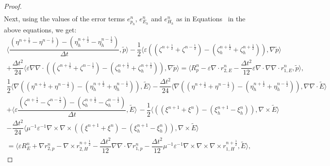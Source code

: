 \documentclass{amsart}
\theoremstyle{thmstyleone}%
\theoremstyle{thmstyletwo}%
\theoremstyle{thmstylethree}%
\newcommand{\aInnerproduct}[2]{\bigl\langle #1, #2 \bigr\rangle}
\begin{document}
\begin{proof}
\begin{multline*}
 \end{multline*}
 Next, using the values of the error terms $e_{p_h}^n$, $e_{E_h}^n$ and $e_{H_h}^n$ as in Equations~ in the above equations, we get:
 \begin{multline*}
  \aInnerproduct{\dfrac{\left(\eta^{n + \frac{1}{2}} - \eta^{n - \frac{1}{2}}\right) - \left( \eta^{n + \frac{1}{2}}_h - \eta^{n - \frac{1}{2}}_h \right)}{\Delta t}}{\widetilde{p}}  - \dfrac{1}{2} \aInnerproduct{ \varepsilon \left( \left( \zeta^{n + \frac{1}{2}} + \zeta^{n - \frac{1}{2}} \right) - \left(\zeta_h^{n + \frac{1}{2}} + \zeta^{n + \frac{1}{2}}_h \right) \right)}{\nabla \widetilde{p}} \\ + \dfrac{\Delta t^2}{24} \aInnerproduct{\varepsilon \nabla \nabla \cdot \left( \left( \zeta^{n + \frac{1}{2}} + \zeta^{n - \frac{1}{2}} \right) - \left(\zeta_h^{n + \frac{1}{2}} + \zeta^{n + \frac{1}{2}}_h \right) \right)}{\nabla \widetilde{p}} = \aInnerproduct{R_p^{n} - \varepsilon \nabla \cdot r_{2,E}^n - \dfrac{\Delta t^2}{12} \varepsilon \nabla \cdot \nabla \nabla \cdot r_{1,E}^n }{\widetilde{p}},
\end{multline*}
\begin{multline*}
  \dfrac{1}{2} \aInnerproduct{\nabla \left( \left( \eta^{n + \frac{1}{2}} + \eta^{n - \frac{1}{2}} \right) - \left( \eta^{n + \frac{1}{2}}_h + \eta^{n - \frac{1}{2}}_h \right) \right)}{\widetilde{E}} - \dfrac{\Delta t^2}{24} \aInnerproduct{\nabla \left( \left( \eta^{n + \frac{1}{2}} + \eta^{n - \frac{1}{2}} \right) - \left( \eta^{n + \frac{1}{2}}_h + \eta^{n - \frac{1}{2}}_h \right)\right)}{\nabla \nabla \cdot \widetilde{E}} \\ + \aInnerproduct{\varepsilon \dfrac{\left( \zeta^{n + \frac{1}{2}} - \zeta^{n - \frac{1}{2}} \right) - \left(\zeta^{n + \frac{1}{2}}_h - \zeta^{n - \frac{1}{2}}_h \right)}{\Delta t}}{\widetilde{E}} \, -
  \dfrac{1}{2} \aInnerproduct{\left( \left( \xi^{n + 1} + \xi^{n} \right) - \left(\xi^{n + 1}_h - \xi^{n}_h \right) \right)}{\nabla \times \widetilde{E}} \\ - \dfrac{\Delta t^2}{24} \aInnerproduct{ \mu^{-1}\varepsilon^{-1} \nabla \times \nabla \times \left( \left( \xi^{n + 1} + \xi^{n} \right) - \left(\xi^{n + 1}_h - \xi^{n}_h \right) \right)}{\nabla \times \widetilde{E}} \\ = \aInnerproduct{\varepsilon R_E^n + \nabla r_{2,p}^n - \nabla \times r_{2,H}^{n+\frac{1}{2}} - \dfrac{\Delta t^2}{12} \nabla \nabla \cdot \nabla r_{1,p}^n - \dfrac{\Delta t^2}{12}  \mu^{-1}\varepsilon^{-1} \nabla \times \nabla \times \nabla \times r_{1,H}^{n+\frac{1}{2}}}{\widetilde{E}},

\end{multline*}
\end{proof}
\end{document}
